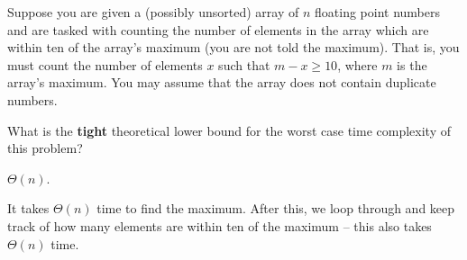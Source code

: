 \begin{prob}
    Suppose you are given a (possibly unsorted) array of $n$ floating point numbers and are tasked with counting the number
    of elements in the array which are within ten of the array's maximum (you are not told the maximum).
    That is, you must count the number of elements $x$ such that $m - x \geq 10$, where $m$ is the array's
    maximum. You may assume that the array does not contain duplicate numbers.

    What is the \textbf{tight} theoretical lower bound for the worst case time complexity of this problem?

    \begin{soln}
        $\Theta(n)$.

        It takes $\Theta(n)$ time to find the maximum. After this, we loop through and keep track of how many
        elements are within ten of the maximum -- this also takes $\Theta(n)$ time.
    \end{soln}

\end{prob}
